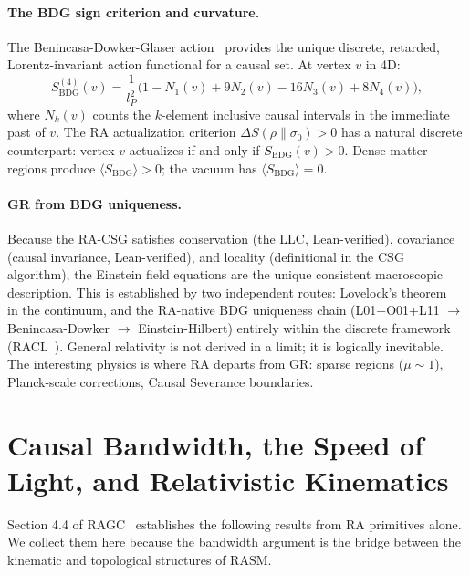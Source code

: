\documentclass[11pt,a4paper]{article}
\newcommand{\SBDG}{S_{\mathrm{BDG}}}
\begin{document}
\paragraph{The BDG sign criterion and curvature.}
The Benincasa-Dowker-Glaser action~\citep{Benincasa2010} provides the unique
discrete, retarded, Lorentz-invariant action functional for a causal set.
At vertex $v$ in 4D:
\begin{equation}
  \SBDG^{(4)}(v)
  = \frac{1}{l_P^2}\bigl(1 - N_1(v) + 9N_2(v) - 16N_3(v) + 8N_4(v)\bigr),
  \label{eq:BDG_4d}
\end{equation}
where $N_k(v)$ counts the $k$-element inclusive causal intervals in the
immediate past of $v$. The RA actualization criterion $\Delta S(\rho\|\sigma_0) > 0$
has a natural discrete counterpart: vertex $v$ actualizes if and only if
$\SBDG(v) > 0$. Dense matter regions produce $\langle \SBDG \rangle > 0$;
the vacuum has $\langle \SBDG \rangle = 0$.

\paragraph{GR from BDG uniqueness.}
Because the RA-CSG satisfies conservation (the LLC, Lean-verified), covariance
(causal invariance, Lean-verified), and locality (definitional in the CSG
algorithm), the Einstein field equations are the unique consistent macroscopic
description. This is established by two independent routes: Lovelock's
theorem~\citep{Lovelock1971} in the continuum, and the RA-native BDG
uniqueness chain (L01+O01+L11 $\to$ Benincasa-Dowker $\to$
Einstein-Hilbert) entirely within the discrete framework
(RACL~\citep{Sandeman2026RACL}). General relativity is
not derived in a limit; it is logically inevitable. The interesting physics
is where RA departs from GR: sparse regions ($\mu \sim 1$), Planck-scale
corrections, Causal Severance boundaries.

\section{Causal Bandwidth, the Speed of Light, and Relativistic Kinematics}
\label{sec:bandwidth}

Section 4.4 of RAGC~\citep{Sandeman2026RAGC} establishes the following results
from RA primitives alone. We collect them here because the bandwidth argument
is the bridge between the kinematic and topological structures of RASM.
\end{document}
